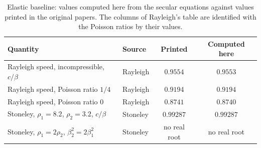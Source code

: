 \begin{table}[ht]\centering\small
\caption{Elastic baseline: values computed here from the secular equations against values printed in the original papers. The columns of Rayleigh's table are identified with the Poisson ratios by their values.}\label{tab:layered}
\begin{tabular}{@{}llcc@{}}\toprule
Quantity & Source & Printed & Computed here\\\midrule
Rayleigh speed, incompressible, $c/\beta$ & Rayleigh \citep{Rayleigh1885} & $0.9554$ & $0.9553$\\
Rayleigh speed, Poisson ratio $1/4$ & Rayleigh \citep{Rayleigh1885} & $0.9194$ & $0.9194$\\
Rayleigh speed, Poisson ratio $0$ & Rayleigh \citep{Rayleigh1885} & $0.8741$ & $0.8740$\\
Stoneley, $\rho_1=8.2$, $\rho_2=3.2$, $c/\beta$ & Stoneley \citep{Stoneley1924} & $0.99287$ & $0.99287$\\
Stoneley, $\rho_1=2\rho_2$, $\beta_2^2=2\beta_1^2$ & Stoneley \citep{Stoneley1924} & no real root & no real root\\\bottomrule
\end{tabular}
\end{table}

